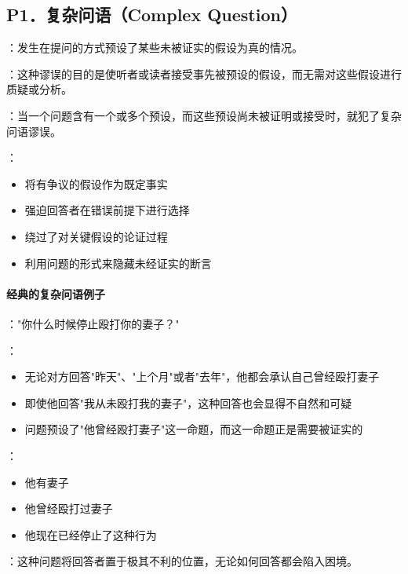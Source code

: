 \subsection{P1．复杂问语（Complex Question）}

\begin{theorembox}[title=复杂问语谬误的定义与机制]
：发生在提问的方式预设了某些未被证实的假设为真的情况。

：这种谬误的目的是使听者或读者接受事先被预设的假设，而无需对这些假设进行质疑或分析。

：当一个问题含有一个或多个预设，而这些预设尚未被证明或接受时，就犯了复杂问语谬误。

：
\begin{itemize}
  \item 将有争议的假设作为既定事实
  \item 强迫回答者在错误前提下进行选择
  \item 绕过了对关键假设的论证过程
  \item 利用问题的形式来隐藏未经证实的断言
\end{itemize}
\end{theorembox}

\paragraph{经典的复杂问语例子}
\begin{examplebox}[title=经典的复杂问语例子]
："你什么时候停止殴打你的妻子？"

：
\begin{itemize}
  \item 无论对方回答"昨天"、"上个月"或者"去年"，他都会承认自己曾经殴打妻子
  \item 即使他回答"我从未殴打我的妻子"，这种回答也会显得不自然和可疑
  \item 问题预设了"他曾经殴打妻子"这一命题，而这一命题正是需要被证实的
\end{itemize}

：
\begin{itemize}
  \item 他有妻子
  \item 他曾经殴打过妻子
  \item 他现在已经停止了这种行为
\end{itemize}

：这种问题将回答者置于极其不利的位置，无论如何回答都会陷入困境。
\end{examplebox}

